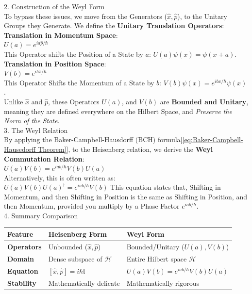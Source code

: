 \documentclass[a4paper, 10pt, onepage]{elegantbook}
\begin{document}
{    2. Construction of the Weyl Form  \\

To bypass these issues, we move from the Generators ($\hat{x}, \hat{p}$), to the Unitary Groups they Generate. We define the \textbf{Unitary Translation Operators}:  \\

\textbf{Translation in Momentum Space}:  \\
$ U(a) = e^{i a \hat{p} / \hbar}$  \\
This Operator shifts the Position of a State by $a$: $U(a)\psi(x) = \psi(x+a)$.  \\

  \textbf{Translation in Position Space}:  \\
$ V(b) = e^{i b \hat{x} / \hbar}$  \\
This Operator Shifts the Momentum of a State by $b$: $V(b)\psi(x) = e^{ibx/\hbar}\psi(x)$.  \\

Unlike $\hat{x}$ and $\hat{p}$, these Operators $U(a)$, and $V(b)$ are \textbf{Bounded and Unitary}, meaning they are defined everywhere on the Hilbert Space, and \emph{Preserve the Norm of the State}.  \\

  3. The Weyl Relation  \\

By applying the Baker-Campbell-Hausdorff (BCH) formula[\eqref{eq:Baker-Campbell-Hausedorff Theorem}],  to the Heisenberg relation, we derive the \textbf{Weyl Commutation Relation}:  \\
$U(a)V(b) = e^{iab/\hbar} V(b)U(a)$  \\
Alternatively, this is often written as:  \\
$ U(a)V(b)U(a)^\dagger = e^{iab/\hbar} V(b)$
This equation states that, Shifting in Momentum, and then Shifting in Position is the same as Shifting in Position, and then Momentum, provided you multiply by a Phase Factor $e^{iab/\hbar}$.  \\

    4. Summary Comparison  \\

\begin{tabular}{|l|l|l|}
\hline
\textbf{Feature} & \textbf{Heisenberg Form} & \textbf{Weyl Form} \\
\hline
\textbf{Operators} & Unbounded ($\hat{x}, \hat{p}$) & Bounded/Unitary ($U(a), V(b)$) \\
\hline
\textbf{Domain} & Dense subspace of $\mathcal{H}$ & Entire Hilbert space $\mathcal{H}$ \\
\hline
\textbf{Equation} & $[\hat{x}, \hat{p}] = i\hbar \mathbb{I}$ & $U(a)V(b) = e^{iab/\hbar} V(b)U(a)$ \\
\hline
\textbf{Stability} & Mathematically delicate & Mathematically rigorous \\
\hline
\end{tabular} \\

}
\end{document}

